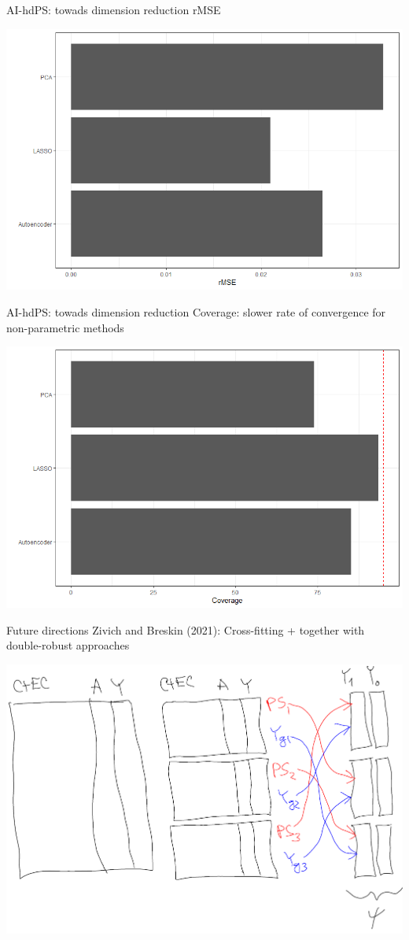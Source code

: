\documentclass[
  ignorenonframetext,
  aspectratio=169]{beamer}
\begin{document}
\begin{frame}{AI-hdPS: towads dimension reduction}
\protect\hypertarget{ai-hdps-towads-dimension-reduction-3}{}
rMSE

\begin{center}
\includegraphics[width=0.5\linewidth]{rMSE.png}
\end{center}
\end{frame}

\begin{frame}{AI-hdPS: towads dimension reduction}
\protect\hypertarget{ai-hdps-towads-dimension-reduction-4}{}
Coverage: slower rate of convergence for non-parametric methods

\begin{center}
\includegraphics[width=0.5\linewidth]{Coverage.png}
\end{center}
\end{frame}

\begin{frame}{Future directions}
\protect\hypertarget{future-directions}{}
Zivich and Breskin (2021): Cross-fitting + together with double-robust
approaches

\begin{center}
\includegraphics[width=0.6\linewidth]{cf.png} 
\end{center}
\end{frame}
\end{document}
